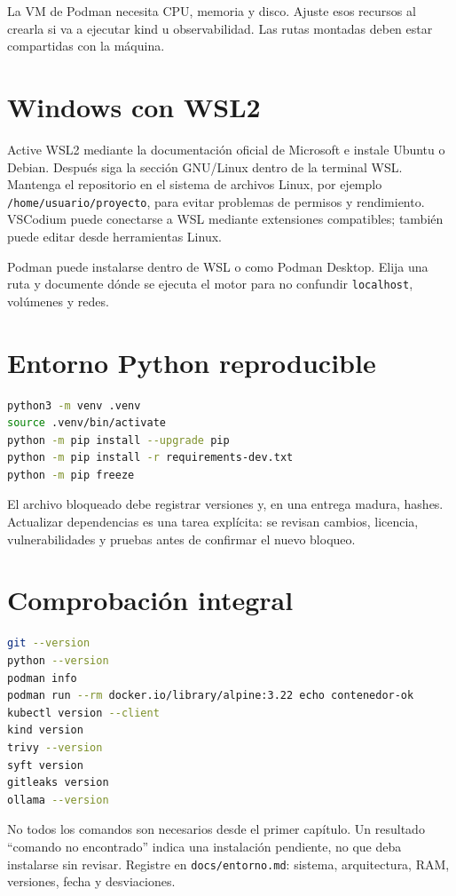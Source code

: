 La VM de Podman necesita CPU, memoria y disco. Ajuste esos recursos al crearla si va a ejecutar kind u observabilidad. Las rutas montadas deben estar compartidas con la máquina.

\section{Windows con WSL2}

Active WSL2 mediante la documentación oficial de Microsoft e instale Ubuntu o Debian. Después siga la sección GNU/Linux dentro de la terminal WSL. Mantenga el repositorio en el sistema de archivos Linux, por ejemplo \texttt{/home/usuario/proyecto}, para evitar problemas de permisos y rendimiento. VSCodium puede conectarse a WSL mediante extensiones compatibles; también puede editar desde herramientas Linux.

Podman puede instalarse dentro de WSL o como Podman Desktop. Elija una ruta y documente dónde se ejecuta el motor para no confundir \texttt{localhost}, volúmenes y redes.

\section{Entorno Python reproducible}

\begin{lstlisting}[language=bash]
python3 -m venv .venv
source .venv/bin/activate
python -m pip install --upgrade pip
python -m pip install -r requirements-dev.txt
python -m pip freeze
\end{lstlisting}

El archivo bloqueado debe registrar versiones y, en una entrega madura, hashes. Actualizar dependencias es una tarea explícita: se revisan cambios, licencia, vulnerabilidades y pruebas antes de confirmar el nuevo bloqueo.

\section{Comprobación integral}

\begin{lstlisting}[language=bash]
git --version
python --version
podman info
podman run --rm docker.io/library/alpine:3.22 echo contenedor-ok
kubectl version --client
kind version
trivy --version
syft version
gitleaks version
ollama --version
\end{lstlisting}

No todos los comandos son necesarios desde el primer capítulo. Un resultado ``comando no encontrado'' indica una instalación pendiente, no que deba instalarse sin revisar. Registre en \texttt{docs/entorno.md}: sistema, arquitectura, RAM, versiones, fecha y desviaciones.

